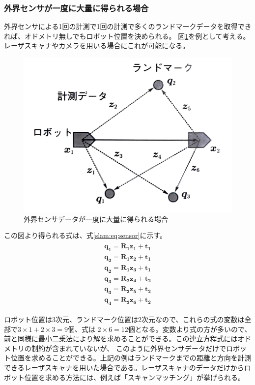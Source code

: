 \subsubsection{外界センサが一度に大量に得られる場合}
外界センサによる1回の計測で1回の計測で多くのランドマークデータを取得できれば、オドメトリ無しでもロボット位置を決められる。
図\ref{slam:sensor}を例として考える。レーザスキャナやカメラを用いる場合にこれが可能になる。

\begin{figure}[h]
  \begin{center}
  \includegraphics[width=.6\columnwidth]{img/slam_8.pdf}
  \caption{外界センサデータが一度に大量に得られる場合\cite{slam:nyumon}}
  \label{slam:sensor}
  \end{center}
\end{figure}

この図より得られる式は、式\eqref{slam:eq:sensor}に示す。
\begin{align}
  \begin{split}
    \bm{q_1} = \bm{R_1z_1+t_1}\\
    \bm{q_2} = \bm{R_1z_2+t_1}\\
    \bm{q_2} = \bm{R_1z_3+t_1}\\
    \bm{q_3} = \bm{R_2z_4+t_2}\\
    \bm{q_3} = \bm{R_3z_5+t_2}\\
    \bm{q_4} = \bm{R_3z_6+t_2} \label{slam:eq:sensor}
  \end{split}
\end{align}

ロボット位置は3次元、ランドマーク位置は2次元なので、これらの式の変数は全部で$3\times1+2\times3=9$個、式は
$2\times6 = 12$個となる。変数より式の方が多いので、前と同様に最小二乗法により解を求めることができる。この連立方程式にはオドメトリの制約が含まれていないが、
このように外界センサデータだけでロボット位置を求めることができる。上記の例はランドマークまでの距離と方向を計測できるレーザスキャナを用いた場合である。レーザスキャナのデータだけからロボット位置を求める方法には、例えば「スキャンマッチング」が挙げられる。

